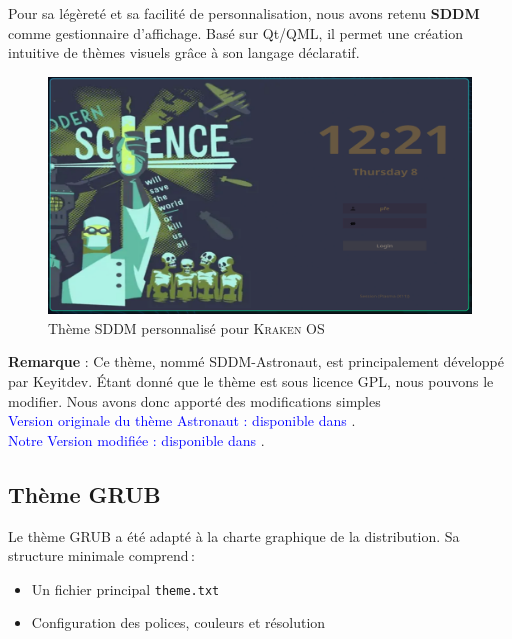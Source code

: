 Pour sa légèreté et sa facilité de personnalisation, nous avons retenu \textbf{SDDM} comme gestionnaire d’affichage.  
Basé sur Qt/QML, il permet une création intuitive de thèmes visuels grâce à son langage déclaratif.

\begin{figure}[H]
  \centering
  \includegraphics[width=1\textwidth]{images_pfe/sddmkrakentheme.png}
  \caption{Thème SDDM personnalisé pour \textsc{Kraken OS}}
  \label{fig:sddm-custom}
\end{figure}

    \textbf{Remarque} : Ce thème, nommé SDDM-Astronaut, est principalement développé par Keyitdev.
Étant donné que le thème est sous licence GPL, nous pouvons le modifier. Nous avons donc apporté des modifications simples\\

\textcolor{blue}{Version originale du thème Astronaut : disponible dans \cite{sddm_theme_astronaut}}.\\
\textcolor{blue}{Notre Version modifiée : disponible dans \cite{sddm_theme_kraken}}.\\
\subsection{Thème GRUB}
\label{subsec:grub-theme}

Le thème GRUB a été adapté à la charte graphique de la distribution. Sa structure minimale comprend :
\begin{itemize}
    \item Un fichier principal \texttt{theme.txt} 
    \item Configuration des polices, couleurs et résolution
   
\end{itemize}



